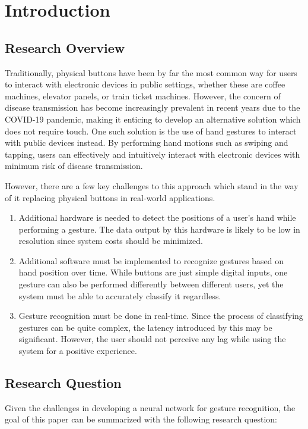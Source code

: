 \setlength{\parskip}{\baselineskip}%
\setlength{\parindent}{0pt}%

\section{Introduction}\label{sec:introduction}
\subsection{Research Overview}\label{subsec:research-overview}
Traditionally, physical buttons have been by far the most common way for users to interact with electronic devices in public settings, whether these are coffee machines, elevator panels, or train ticket machines.
However, the concern of disease transmission has become increasingly prevalent in recent years due to the COVID-19 pandemic, making it enticing to develop an alternative solution which does not require touch.
One such solution is the use of hand gestures to interact with public devices instead.
By performing hand motions such as swiping and tapping, users can effectively and intuitively interact with electronic devices with minimum risk of disease transmission.

However, there are a few key challenges to this approach which stand in the way of it replacing physical buttons in real-world applications.
\begin{enumerate}
    \item Additional hardware is needed to detect the positions of a user's hand while performing a gesture.
    The data output by this hardware is likely to be low in resolution since system costs should be minimized.
    \item Additional software must be implemented to recognize gestures based on hand position over time.
    While buttons are just simple digital inputs, one gesture can also be performed differently between different users, yet the system must be able to accurately classify it regardless.
    \item Gesture recognition must be done in real-time.
    Since the process of classifying gestures can be quite complex, the latency introduced by this may be significant.
    However, the user should not perceive any lag while using the system for a positive experience.
\end{enumerate}

\subsection{Research Question}\label{subsec:research-question}
Given the challenges in developing a neural network for gesture recognition, the goal of this paper can be summarized with the following research question:

